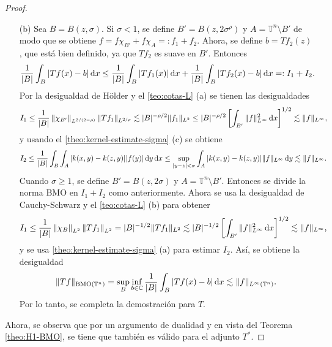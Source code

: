 \begin{proof}
\begin{itemize}
		\item[(b)] Sea $B = B(z, \sigma)$. Si $\sigma < 1$, se define $B'=B(z, 2\sigma^\rho)$ y $A = \mathbb{T}^n\setminus B'$ de modo que se obtiene $f = f\chi_{B'} + f\chi_A =: f_1 + f_2$. Ahora, se define $b = Tf_2(z)$, que está bien definido, ya que $Tf_2$ es suave en $B'$. Entonces 
		\begin{equation*}
			\frac{1}{|B|}\int_B|Tf(x) - b| \mathop{}\!\mathrm{d} x \leq \frac{1}{|B|}\int_B|Tf_1(x)|\mathop{}\!\mathrm{d} x + \frac{1}{|B|}\int_B|Tf_2(x) -b|\mathop{}\!\mathrm{d} x =: I_1 + I_2.
		\end{equation*}
		Por la desigualdad de H\"older y el \cref{teo:cotas-L} (a) se tienen las desigualdades
		\begin{equation*}
			I_1 \leq \frac{1}{|B|}\left\|\chi_{B'}\right\|_{L^{2/(2-\rho)}}\|Tf_1\|_{L^{2/\rho}}
			\lesssim |B|^{-\rho/2}\|f_1\|_{L^2} \leq |B|^{-\rho/2}\left[\int_{B'}\|f\|^2_{L^\infty}\mathop{}\!\mathrm{d} x\right]^{1/2} \lesssim  \|f\|_{L^\infty},
		\end{equation*}
		y usando el \cref{theo:kernel-estimate-sigma} (c) se obtiene 
		\begin{equation*}
			I_2 \leq \frac{1}{|B|}\int_B\int_A|k(x, y) - k(z, y)||f(y)|\mathop{}\!\mathrm{d} y \mathop{}\!\mathrm{d} x \leq \sup_{|y-z|<\sigma}\int_A|k(x, y) - k(z, y)|\|f\|_{L^\infty} \mathop{}\!\mathrm{d} y \lesssim \|f\|_{L^\infty}.
		\end{equation*}
		Cuando $\sigma \geq 1$, se define $B'=B(z, 2\sigma)$ y $A = \mathbb{T}^n\setminus B'$. Entonces se divide la norma BMO en $I_1 + I_2$ como anteriormente. Ahora se usa la desigualdad de Cauchy-Schwarz y el \cref{teo:cotas-L} (b) para obtener
		\begin{equation*}
			I_1 \leq\frac{1}{|B|} \left\|\chi_B\right\|_{L^2}\left\|Tf_1\right\|_{L^2} = |B|^{-1/2}\|Tf_1\|_{L^2} \lesssim |B|^{-1/2}\left[\int_{B'}\|f\|^2_{L^\infty}\mathop{}\!\mathrm{d} x\right]^{1/2} \lesssim  \|f\|_{L^\infty},
		\end{equation*}
		y se usa \cref{theo:kernel-estimate-sigma} (a) para estimar $I_2$. Así, se obtiene la desigualdad
		\begin{equation*}
			\|Tf\|_{\mathrm{BMO}(\mathbb{T}^n)} = \sup_B \inf_{b\in \mathbb{C}} \frac{1}{|B|} \int_B |Tf(x) - b|\mathop{}\!\mathrm{d} x \lesssim \|f\|_{L^\infty(\mathbb{T}^n)}.
		\end{equation*}
		Por lo tanto, se completa la demostración para $T$. 
	\end{itemize}  
	Ahora, se observa que por un argumento de dualidad y en vista del Teorema \ref{theo:H1-BMO}, se tiene que también es válido para el adjunto $T^*$.
\end{proof}
